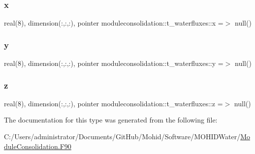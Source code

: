 \subsubsection{\texorpdfstring{x}{x}}
{\footnotesize\ttfamily real(8), dimension(\+:,\+:,\+:), pointer moduleconsolidation\+::t\+\_\+waterfluxes\+::x =$>$ null()\hspace{0.3cm}{\ttfamily [private]}}

\mbox{\label{structmoduleconsolidation_1_1t__waterfluxes_a72d7a0ac73918ace4b4a2f318bb1d6df}} 
\subsubsection{\texorpdfstring{y}{y}}
{\footnotesize\ttfamily real(8), dimension(\+:,\+:,\+:), pointer moduleconsolidation\+::t\+\_\+waterfluxes\+::y =$>$ null()\hspace{0.3cm}{\ttfamily [private]}}

\mbox{\label{structmoduleconsolidation_1_1t__waterfluxes_ab9a2d284ea231db0347ffc8d12167826}} 
\subsubsection{\texorpdfstring{z}{z}}
{\footnotesize\ttfamily real(8), dimension(\+:,\+:,\+:), pointer moduleconsolidation\+::t\+\_\+waterfluxes\+::z =$>$ null()\hspace{0.3cm}{\ttfamily [private]}}



The documentation for this type was generated from the following file\+:\begin{DoxyCompactItemize}
\item 
C\+:/\+Users/administrator/\+Documents/\+Git\+Hub/\+Mohid/\+Software/\+M\+O\+H\+I\+D\+Water/\mbox{\hyperlink{_module_consolidation_8_f90}{Module\+Consolidation.\+F90}}\end{DoxyCompactItemize}
